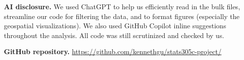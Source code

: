 \documentclass[11pt]{article}
\begin{document}
\newpage
\textbf{AI disclosure.} We used ChatGPT to help us efficiently read in the bulk files, streamline our code for filtering the data, and to format figures (especially the geospatial visualizations). We also used GitHub Copilot inline suggestions throughout the analysis. All code was still scrutinized and checked by us.

\textbf{GitHub repository.} \href{https://github.com/kennethgu/stats305c-project/}{https://github.com/kennethgu/stats305c-project/}

%  
% 
\end{document}
